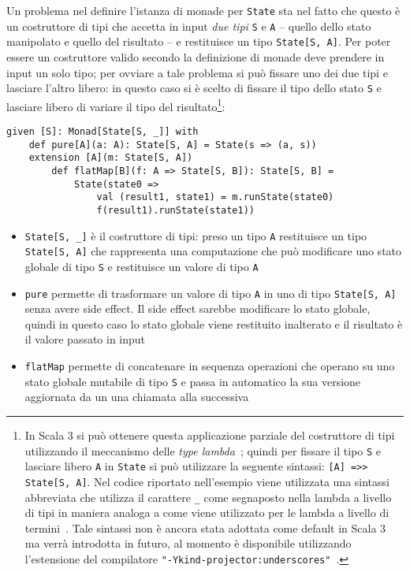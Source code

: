 Un problema nel definire l'istanza di monade per \lstinline{State} sta nel fatto che questo è un costruttore di tipi che accetta in input \emph{due tipi} \lstinline{S} e \lstinline{A} -- quello dello stato manipolato e quello del risultato -- e restituisce un tipo \lstinline{State[S, A]}. Per poter essere un costruttore valido secondo la definizione di monade deve prendere in input un solo tipo; per ovviare a tale problema si può fissare uno dei due tipi e lasciare l'altro libero: in questo caso si è scelto di fissare il tipo dello stato \lstinline{S} e lasciare libero di variare il tipo del risultato\footnote{In Scala 3 si può ottenere questa applicazione parziale del costruttore di tipi utilizzando il meccanismo delle \emph{type lambda}~\cite{cit:scala-reference-type-lambdas}; quindi per fissare il tipo \lstinline{S} e lasciare libero \lstinline{A} in \lstinline{State} si può utilizzare la seguente sintassi: \lstinline{[A] =>> State[S, A]}. Nel codice riportato nell'esempio viene utilizzata una sintassi abbreviata che utilizza il carattere \lstinline{_} come segnaposto nella lambda a livello di tipi in maniera analoga a come viene utilizzato per le lambda a livello di termini~\cite{cit:scala-reference-wildcard-arguments-in-types}. Tale sintassi non è ancora stata adottata come default in Scala 3 ma verrà introdotta in futuro, al momento è disponibile utilizzando l'estensione del compilatore \lstinline{"-Ykind-projector:underscores"}~\cite{cit:scala-reference-kind-projector-migration}.}:
\begin{lstlisting}[language=scala3]
given [S]: Monad[State[S, _]] with
	def pure[A](a: A): State[S, A] = State(s => (a, s))
	extension [A](m: State[S, A])
		def flatMap[B](f: A => State[S, B]): State[S, B] = 
			State(state0 =>
				val (result1, state1) = m.runState(state0)
				f(result1).runState(state1))
\end{lstlisting}

\begin{itemize}
  \item \lstinline{State[S, _]} è il costruttore di tipi: preso un tipo \lstinline{A} restituisce un tipo \lstinline{State[S, A]} che rappresenta una computazione che può modificare uno stato globale di tipo \lstinline{S} e restituisce un valore di tipo \lstinline{A}
  \item \lstinline{pure} permette di trasformare un valore di tipo  \lstinline{A} in uno di tipo \lstinline{State[S, A]} senza avere side effect. Il side effect sarebbe modificare lo stato globale, quindi in questo caso lo stato globale viene restituito inalterato e il risultato è il valore passato in input
  \item \lstinline{flatMap} permette di concatenare in sequenza operazioni che operano su uno stato globale mutabile di tipo \lstinline{S} e passa in automatico la sua versione aggiornata da un una chiamata alla successiva
\end{itemize}

